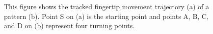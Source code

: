     \begin{figure}[!t]
        \centering
        \hspace{0.2cm}
        \caption{This figure shows the tracked fingertip movement trajectory (a) of a pattern (b). Point S on (a) is the starting point and points A, B, C, and D on (b) represent four turning points.}
        \label{fig:fig6}
        \vspace{-4mm}
    \end{figure}

